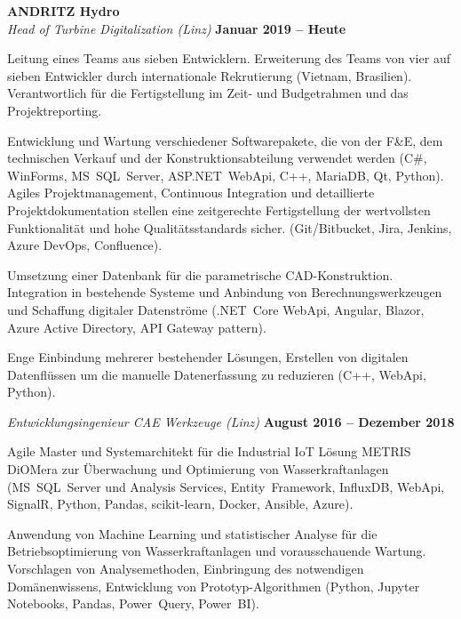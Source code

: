 \documentclass[line,11pt,a4paper]{../resume}
\begin{document}
\begin{resume}
\textbf{ANDRITZ Hydro}\\\vspace{1mm}%
\textsl{Head of Turbine Digitalization (Linz)}
  \hfill \textbf{Januar 2019 -- Heute}\\
\vspace{-4mm}%
\begin{list2}
  \item Leitung eines Teams aus sieben Entwicklern. Erweiterung des Teams von
    vier auf sieben Entwickler durch internationale Rekrutierung (Vietnam,
    Brasilien). Verantwortlich für die Fertigstellung im Zeit- und Budgetrahmen
    und das Projektreporting.
  \item Entwicklung und Wartung verschiedener Softwarepakete, die von der F\&E,
    dem technischen Verkauf und der Konstruktionsabteilung verwendet werden
    (C\#, WinForms, MS~SQL~Server, ASP.NET~WebApi, C++, MariaDB, Qt, Python).
    Agiles Projektmanagement, Continuous Integration und detaillierte
    Projektdokumentation stellen eine zeitgerechte Fertigstellung der
    wertvollsten Funktionalität und hohe Qualitätsstandards sicher.
    (Git/Bitbucket, Jira, Jenkins, Azure DevOps, Confluence).
  \item Umsetzung einer Datenbank für die parametrische CAD-Konstruktion.
    Integration in bestehende Systeme und Anbindung von Berechnungswerkzeugen
    und Schaffung digitaler Datenströme (.NET~Core WebApi, Angular, Blazor,
    Azure Active Directory, API Gateway pattern).
  \item Enge Einbindung mehrerer bestehender Lösungen, Erstellen von digitalen
    Datenflüssen um die manuelle Datenerfassung zu reduzieren (C++, WebApi,
    Python).
\end{list2}

\textsl{Entwicklungsingenieur CAE Werkzeuge (Linz)}
  \hfill \textbf{August 2016 -- Dezember 2018}\\
\vspace{-4mm}%
\begin{list2}
  \item Agile Master und Systemarchitekt für die Industrial IoT Lösung METRIS
    DiOMera zur Überwachung und Optimierung von Wasserkraftanlagen
    (MS~SQL~Server und Analysis Services, Entity~Framework, InfluxDB, WebApi,
    SignalR, Python, Pandas, scikit-learn, Docker, Ansible, Azure).

  \item Anwendung von Machine Learning und statistischer Analyse für die
    Betriebsoptimierung von Wasserkraftanlagen und vorausschauende Wartung.
    Vorschlagen von Analysemethoden, Einbringung des notwendigen
    Domänenwissens, Entwicklung von Prototyp-Algorithmen (Python, Jupyter
    Notebooks, Pandas, Power~Query, Power~BI).
\end{list2}


\end{resume}
\end{document}
